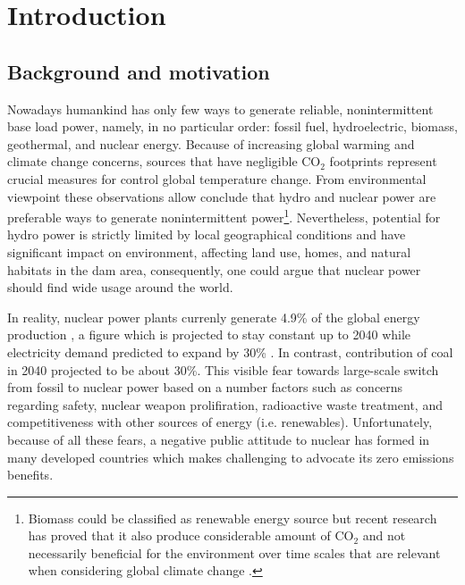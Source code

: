 \chapter[Introduction]{Introduction}

\section{Background and motivation}

Nowadays humankind has only few ways to generate reliable, nonintermittent base load power, namely, in no particular order: fossil fuel, hydroelectric, biomass, geothermal, and nuclear energy. Because of increasing global warming and climate change concerns, sources that have negligible CO$_2$ footprints represent crucial measures for control global temperature change. From environmental viewpoint these observations allow conclude that hydro and nuclear power are preferable ways to generate nonintermittent power\footnote{Biomass could be classified as renewable energy source but recent research has proved that it also produce considerable amount of CO$_2$ and not necessarily beneficial for the environment over time scales that are relevant when considering global climate change \cite{cherubini_co2_2011}.}. Nevertheless, potential for hydro power is strictly limited by local geographical conditions and have significant impact on environment, affecting land use, homes, and natural habitats in the dam area, consequently, one could argue that nuclear power should find wide usage around the world. 
 
In reality, nuclear power plants currenly generate 4.9\% of the global energy production \cite{noauthor_key_nodate}, a figure which is projected to stay constant up to 2040 while electricity demand predicted to expand by 30\% \cite{noauthor_world_2017}. In contrast, contribution of coal in 2040 projected to be about 30\%. This visible fear towards large-scale switch from fossil to nuclear power based on a number factors such as concerns regarding safety, nuclear weapon prolifiration, radioactive waste treatment, and competitiveness with other sources of energy (i.e. renewables). Unfortunately, because of all these fears, a negative public attitude to nuclear has formed in many developed countries which makes challenging to advocate its zero emissions benefits.

